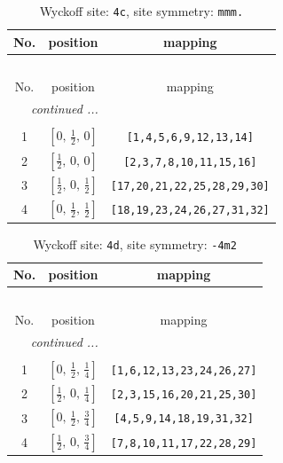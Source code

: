 \documentclass[fleqn,8pt]{jsarticle}
\begin{document}
\renewcommand{\arraystretch}{1.2}
\begin{longtable}{ccc}
\caption{Wyckoff site: {\tt 4c}, site symmetry: {\tt mmm.}}
 \\
 \hline \hline
No. & position & mapping \\ \hline \endfirsthead

\multicolumn{2}{l}{\tablename\ \thetable{}} \\
 \hline \hline
No. & position & mapping \\ \hline \endhead

 \hline \hline
\multicolumn{2}{r}{\footnotesize\it continued ...} \\ \endfoot

 \hline \hline
\multicolumn{2}{r}{} \\ \endlastfoot

1 & $\left[ 0,\, \frac{1}{2},\, 0 \right]$ & {\tt [1,4,5,6,9,12,13,14]} \\ \hline
2 & $\left[ \frac{1}{2},\, 0,\, 0 \right]$ & {\tt [2,3,7,8,10,11,15,16]} \\ \hline
3 & $\left[ \frac{1}{2},\, 0,\, \frac{1}{2} \right]$ & {\tt [17,20,21,22,25,28,29,30]} \\ \hline
4 & $\left[ 0,\, \frac{1}{2},\, \frac{1}{2} \right]$ & {\tt [18,19,23,24,26,27,31,32]} \\
\end{longtable}
\renewcommand{\arraystretch}{1.2}
\begin{longtable}{ccc}
\caption{Wyckoff site: {\tt 4d}, site symmetry: {\tt -4m2}}
 \\
 \hline \hline
No. & position & mapping \\ \hline \endfirsthead

\multicolumn{2}{l}{\tablename\ \thetable{}} \\
 \hline \hline
No. & position & mapping \\ \hline \endhead

 \hline \hline
\multicolumn{2}{r}{\footnotesize\it continued ...} \\ \endfoot

 \hline \hline
\multicolumn{2}{r}{} \\ \endlastfoot

1 & $\left[ 0,\, \frac{1}{2},\, \frac{1}{4} \right]$ & {\tt [1,6,12,13,23,24,26,27]} \\ \hline
2 & $\left[ \frac{1}{2},\, 0,\, \frac{1}{4} \right]$ & {\tt [2,3,15,16,20,21,25,30]} \\ \hline
3 & $\left[ 0,\, \frac{1}{2},\, \frac{3}{4} \right]$ & {\tt [4,5,9,14,18,19,31,32]} \\ \hline
4 & $\left[ \frac{1}{2},\, 0,\, \frac{3}{4} \right]$ & {\tt [7,8,10,11,17,22,28,29]} \\
\end{longtable}
\end{document}
